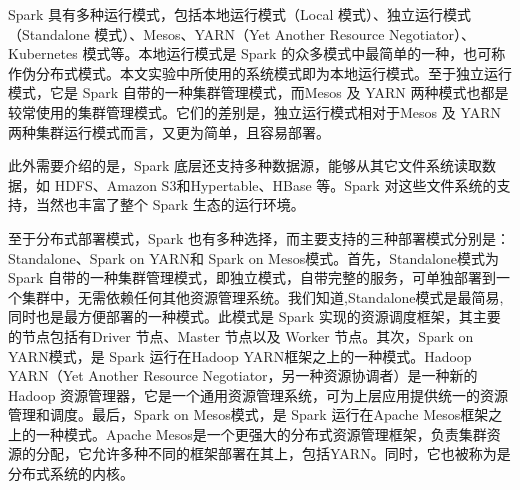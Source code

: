 Spark 具有多种运行模式，包括本地运行模式（Local 模式）、独立运行模式（Standalone 模式）、Mesos、YARN（Yet Another Resource Negotiator）、Kubernetes 模式等。本地运行模式是 Spark 的众多模式中最简单的一种，也可称作伪分布式模式。本文实验中所使用的系统模式即为本地运行模式。至于独立运行模式，它是 Spark 自带的一种集群管理模式，而Mesos 及 YARN 两种模式也都是较常使用的集群管理模式。它们的差别是，独立运行模式相对于Mesos 及 YARN 两种集群运行模式而言，又更为简单，且容易部署。

此外需要介绍的是，Spark 底层还支持多种数据源，能够从其它文件系统读取数据，如 HDFS、Amazon S3和Hypertable、HBase 等。Spark 对这些文件系统的支持，当然也丰富了整个 Spark 生态的运行环境。


至于分布式部署模式，Spark 也有多种选择，而主要支持的三种部署模式分别是：Standalone、Spark on YARN和 Spark on Mesos模式。首先，Standalone模式为 Spark 自带的一种集群管理模式，即独立模式，自带完整的服务，可单独部署到一个集群中，无需依赖任何其他资源管理系统。我们知道,Standalone模式是最简易,同时也是最方便部署的一种模式。此模式是 Spark 实现的资源调度框架，其主要的节点包括有Driver 节点、Master 节点以及 Worker 节点。其次，Spark on YARN模式，是 Spark 运行在Hadoop YARN框架之上的一种模式。Hadoop YARN（Yet Another Resource Negotiator，另一种资源协调者）是一种新的 Hadoop 资源管理器，它是一个通用资源管理系统，可为上层应用提供统一的资源管理和调度。最后，Spark on Mesos模式，是 Spark 运行在Apache Mesos框架之上的一种模式。Apache Mesos是一个更强大的分布式资源管理框架，负责集群资源的分配，它允许多种不同的框架部署在其上，包括YARN。同时，它也被称为是分布式系统的内核。






